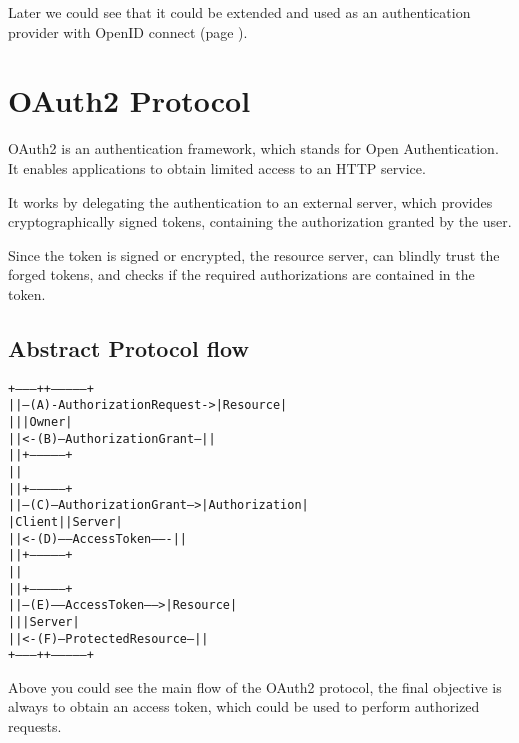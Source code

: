 \documentclass[11pt]{style}
\begin{document}
Later we could see that it could be extended and used as an authentication
provider with OpenID connect (page \pageref{openid}).

\section{OAuth2 Protocol}
OAuth2 is an authentication framework, which stands for Open Authentication.
It enables applications to obtain limited access to an HTTP service.

It works by delegating the authentication to an external server, which provides
cryptographically signed tokens, containing the authorization granted by the
user.

Since the token is signed or encrypted, the resource server, can blindly trust
the forged tokens, and checks if the required authorizations are contained in
the token.


\subsection{Abstract Protocol flow}
\begin{alltt}
     +--------+                               +---------------+
     |        |--(A)- Authorization Request ->|   Resource    |
     |        |                               |     Owner     |
     |        |<-(B)-- Authorization Grant ---|               |
     |        |                               +---------------+
     |        |
     |        |                               +---------------+
     |        |--(C)-- Authorization Grant -->| Authorization |
     | Client |                               |     Server    |
     |        |<-(D)----- Access Token -------|               |
     |        |                               +---------------+
     |        |
     |        |                               +---------------+
     |        |--(E)----- Access Token ------>|    Resource   |
     |        |                               |     Server    |
     |        |<-(F)--- Protected Resource ---|               |
     +--------+                               +---------------+
 \end{alltt}
Above you could see the main flow of the OAuth2 protocol, the final objective is
always to obtain an access token, which could be used to perform authorized
requests.
\end{document}
